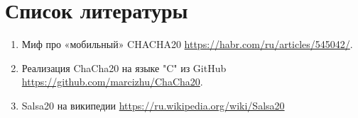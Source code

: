 \documentclass[12pt]{article}
\begin{document}
    \section{Список литературы}

    \begin{enumerate}
        \item Миф про «мобильный» CHACHA20 \url{https://habr.com/ru/articles/545042/}.

        \item Реализация ChaCha20 на языке "C" из GitHub \url{https://github.com/marcizhu/ChaCha20}.

        \item Salsa20 на википедии \url{https://ru.wikipedia.org/wiki/Salsa20}

    \end{enumerate}
\end{document}

